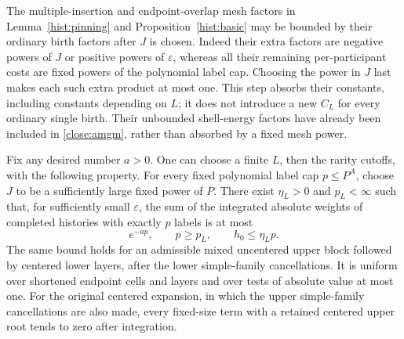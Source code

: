 The multiple-insertion and endpoint-overlap mesh factors in
Lemma~\ref{hist:pinning} and Proposition~\ref{hist:basic} may be bounded
by their ordinary birth factors after $J$ is chosen. Indeed their
extra factors are negative powers of $J$ or positive powers of
$\varepsilon$, whereas all their remaining per-participant costs
are fixed powers of the polynomial label cap. Choosing the power
in $J$ last makes each such extra product at most one. This step
absorbs their constants, including constants depending on $L$;
it does not introduce a new $C_L$ for every ordinary single birth.
Their unbounded shell-energy factors have already been included
in \eqref{close:amgm}, rather than absorbed by a fixed mesh power.

\begin{proposition}
\label{close:summability}
Fix any desired number $a>0$. One can choose a finite $L$, then
the rarity cutoffs, with the following property. For every fixed
polynomial label cap $p\leq P^A$, choose $J$ to be a sufficiently
large fixed power of $P$. There exist $\eta_L>0$ and $p_L<\infty$
such that, for sufficiently small $\varepsilon$, the sum of the
integrated absolute weights of completed histories with exactly
$p$ labels is at most
\begin{equation}\label{close:complete-tail}
 e^{-ap},\qquad p\geq p_L,\qquad h_0\leq\eta_Lp.
\end{equation}
The same bound holds for an admissible mixed uncentered upper
block followed by centered lower layers, after the lower
simple-family cancellations. It is uniform over shortened endpoint
cells and layers and over tests of absolute value at most one.
For the original centered expansion, in which the upper
simple-family cancellations are also made, every fixed-size term
with a retained centered upper root tends to zero after integration.
\end{proposition}
